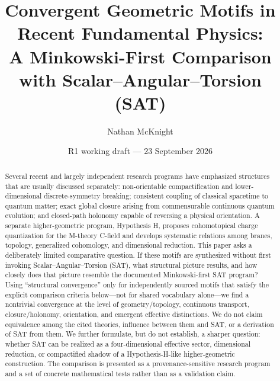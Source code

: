 \documentclass[11pt]{article}
\title{Convergent Geometric Motifs in Recent Fundamental Physics:\\A Minkowski-First Comparison with Scalar--Angular--Torsion (SAT)}
\author{Nathan McKnight}
\date{R1 working draft --- 23 September 2026}
\begin{document}
\maketitle
\begin{center}\end{center}

\begin{abstract}
Several recent and largely independent research programs have emphasized structures that are usually discussed separately: non-orientable compactification and lower-dimensional discrete-symmetry breaking; consistent coupling of classical spacetime to quantum matter; exact global closure arising from commensurable continuous quantum evolution; and closed-path holonomy capable of reversing a physical orientation. A separate higher-geometric program, Hypothesis H, proposes cohomotopical charge quantization for the M-theory C-field and develops systematic relations among branes, topology, generalized cohomology, and dimensional reduction. This paper asks a deliberately limited comparative question. If these motifs are synthesized without first invoking Scalar--Angular--Torsion (SAT), what structural picture results, and how closely does that picture resemble the documented Minkowski-first SAT program? Using ``structural convergence'' only for independently sourced motifs that satisfy the explicit comparison criteria below---not for shared vocabulary alone---we find a nontrivial convergence at the level of geometry/topology, continuous transport, closure/holonomy, orientation, and emergent effective distinctions. We do not claim equivalence among the cited theories, influence between them and SAT, or a derivation of SAT from them. We further formulate, but do not establish, a sharper question: whether SAT can be realized as a four-dimensional effective sector, dimensional reduction, or compactified shadow of a Hypothesis-H-like higher-geometric construction. The comparison is presented as a provenance-sensitive research program and a set of concrete mathematical tests rather than as a validation claim.
\end{abstract}
\end{document}
